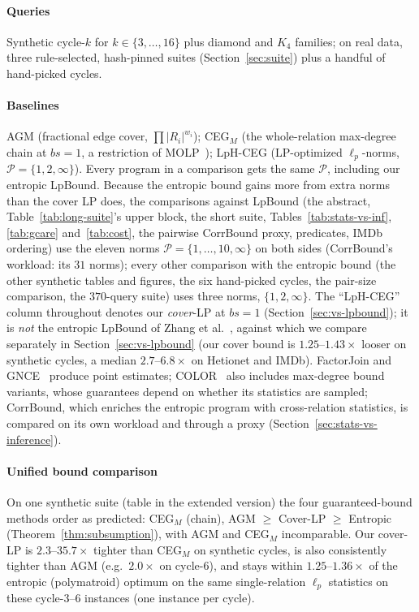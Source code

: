 \documentclass[conference]{IEEEtran}
\begin{document}
\paragraph{Queries}
Synthetic cycle-$k$ for $k \in \{3,\ldots,16\}$ plus diamond and $K_4$ families;
on real data, three rule-selected, hash-pinned suites
(Section~\ref{sec:suite}) plus a handful of hand-picked cycles.

\paragraph{Baselines}
AGM (fractional edge cover, $\prod |R_i|^{w_i}$);
CEG$_M$ (the whole-relation max-degree chain at $bs{=}1$, a restriction of MOLP~\cite{joglekar2016molp,chen2022ceg});
LpH-CEG (LP-optimized $\ell_p$-norms,
$\mathcal{P} = \{1,2,\infty\}$). Every program in a comparison gets the
same $\mathcal{P}$, including our entropic LpBound. Because the entropic
bound gains more from extra norms than the cover LP does, the comparisons
against LpBound (the abstract, Table~\ref{tab:long-suite}'s
upper block, the short suite, Tables~\ref{tab:stats-vs-inf}, \ref{tab:gcare} and~\ref{tab:cost}, the pairwise CorrBound proxy, predicates, IMDb ordering) use
the eleven norms $\mathcal{P}=\{1,\ldots,10,\infty\}$ on both sides (CorrBound's workload: its $31$ norms); every other comparison
with the entropic bound (the other synthetic tables and figures, the six
hand-picked cycles, the pair-size comparison, the $370$-query suite) uses three
norms, $\{1,2,\infty\}$.
The ``LpH-CEG'' column throughout denotes our
\emph{cover}-LP at $bs{=}1$ (Section~\ref{sec:vs-lpbound}); it is
\emph{not} the entropic LpBound of
Zhang et al.~\cite{zhang2025lpbound}, against which we compare
separately in Section~\ref{sec:vs-lpbound} (our cover bound is
$1.25$--$1.43\times$ looser on synthetic cycles, a median
$2.7$--$6.8\times$ on Hetionet and IMDb).
FactorJoin and GNCE~\cite{wu2023factorjoin,schwabe2024gnce} produce point estimates; COLOR~\cite{deeds2025color} also includes max-degree bound variants, whose guarantees depend on whether its statistics are sampled; CorrBound, which enriches the
entropic program with cross-relation statistics, is compared on its own workload and through a proxy (Section~\ref{sec:stats-vs-inference}).

\paragraph{Unified bound comparison}
On one synthetic suite (table in the extended version) the four guaranteed-bound methods order as predicted: CEG$_M$ (chain), AGM $\ge$ Cover-LP $\ge$ Entropic
(Theorem~\ref{thm:subsumption}), with AGM and CEG$_M$ incomparable. Our cover-LP is
$2.3$--$35.7\times$ tighter than CEG$_M$ on synthetic cycles, is also
consistently tighter than AGM (e.g.\ $2.0\times$ on cycle-6), and stays
within $1.25$--$1.36\times$ of the entropic (polymatroid) optimum on the
same single-relation $\ell_p$ statistics on these cycle-$3$--$6$ instances (one instance per cycle).
\end{document}
